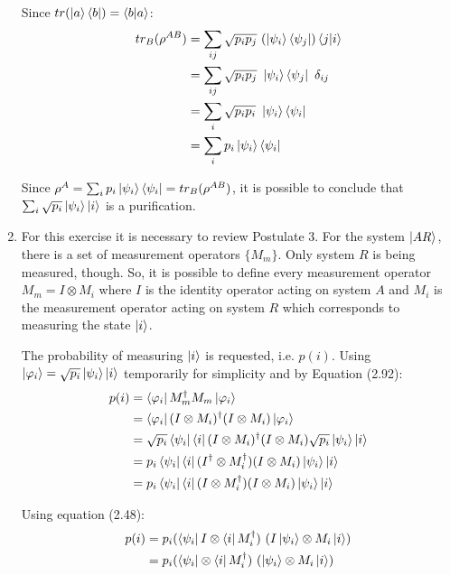 \begin{enumerate}
Since $tr(\ket{a}\bra{b}) = \braket{b|a}$:
\begin{align}
    tr_B(\rho^{AB}) &= \sum_{ij} \sqrt{p_i p_j}\ (\ket{\psi_i}\bra{\psi_j}) \braket{j|i} \\
    &= \sum_{ij} \sqrt{p_i p_j}\ \ket{\psi_i}\bra{\psi_j}\ \delta_{ij} \\
    &= \sum_i \sqrt{p_i p_i}\ \ket{\psi_i}\bra{\psi_i} \\
    &= \sum_i p_i\ket{\psi_i}\bra{\psi_i}
\end{align}

Since $\rho^A = \sum_i p_i \ket{\psi_i}\bra{\psi_i} = tr_B(\rho^{AB})$,
it is possible to conclude that $\sum_i \sqrt{p_i} \ket{\psi_i}\ket{i}$ is a purification.


\item {}

For this exercise it is necessary to review Postulate 3. For the system $\ket{AR}$, there is a set of measurement operators $\{M_m\}$. Only system $R$ is being measured, though. So, it is possible to define every measurement operator $M_m = I \otimes M_i$ where $I$ is the identity operator acting on system $A$ and $M_i$ is the measurement operator acting on system $R$ which corresponds to measuring the state $\ket{i}$.

The probability of measuring $\ket{i}$ is requested, i.e. $p(i)$. Using $\ket{\varphi_i} = \sqrt{p_i}\ket{\psi_i} \ket{i}$ temporarily for simplicity and by Equation (2.92):
\begin{align}
    p(i) &= \bra{\varphi_i}M_m^\dagger M_m \ket{\varphi_i} \\
    &= \bra{\varphi_i}(I \otimes M_i)^\dagger (I \otimes M_i) \ket{\varphi_i} \\
    &= \sqrt{p_i} \bra{\psi_i}\bra{i}(I \otimes M_i)^\dagger
        (I \otimes M_i) \sqrt{p_i}\ket{\psi_i}\ket{i} \\
    &= p_i \bra{\psi_i}\bra{i}(I^\dagger \otimes M_i^\dagger)
        (I \otimes M_i) \ket{\psi_i}\ket{i} \\
    &= p_i \bra{\psi_i}\bra{i}(I \otimes M_i^\dagger)
        (I \otimes M_i) \ket{\psi_i}\ket{i}
\end{align}

Using equation (2.48):
\begin{align}
    p(i) &= p_i (\bra{\psi_i}I \otimes \bra{i}M_i^\dagger)
        \ (I\ket{\psi_i} \otimes M_i\ket{i}) \\
    &= p_i (\bra{\psi_i} \otimes \bra{i}M_i^\dagger )
        \ (\ket{\psi_i} \otimes M_i\ket{i})
\end{align}


\end{enumerate}
